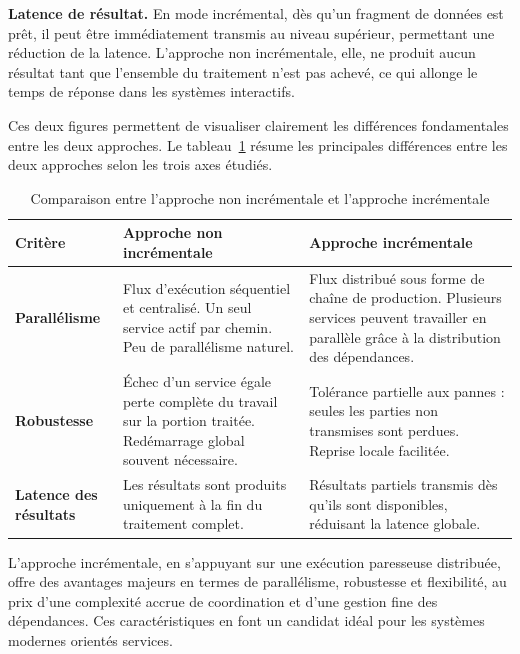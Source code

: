 \textbf{Latence de résultat.}
En mode incrémental, dès qu’un fragment de données est prêt, il peut être immédiatement transmis au niveau supérieur, permettant une réduction de la latence. L’approche non incrémentale, elle, ne produit aucun résultat tant que l’ensemble du traitement n’est pas achevé, ce qui allonge le temps de réponse dans les systèmes interactifs.

Ces deux figures permettent de visualiser clairement les différences fondamentales entre les deux approches. 
Le tableau~\ref{tab:comparaison-approches} résume les principales différences entre les deux approches selon les trois axes étudiés.
\begin{table}[H]
\centering
\caption{Comparaison entre l’approche non incrémentale et l’approche incrémentale}
\label{tab:comparaison-approches}
\begin{tabular}{|p{3cm}|p{5.2cm}|p{5.2cm}|}
\hline
\textbf{Critère} & \textbf{Approche non incrémentale} & \textbf{Approche incrémentale} \\ \hline
\textbf{Parallélisme} 
& Flux d’exécution séquentiel et centralisé.  
Un seul service actif par chemin.  
Peu de parallélisme naturel. 
& Flux distribué sous forme de chaîne de production.  
Plusieurs services peuvent travailler en parallèle grâce à la distribution des dépendances. \\ \hline

\textbf{Robustesse}
& Échec d’un service égale perte complète du travail sur la portion traitée.  
Redémarrage global souvent nécessaire.
& Tolérance partielle aux pannes : seules les parties non transmises sont perdues.  
Reprise locale facilitée. \\ \hline

\textbf{Latence des résultats}
& Les résultats sont produits uniquement à la fin du traitement complet. 
& Résultats partiels transmis dès qu’ils sont disponibles, réduisant la latence globale. \\ \hline

\end{tabular}
\end{table}


L’approche incrémentale, en s’appuyant sur une exécution paresseuse distribuée, offre des avantages majeurs en termes de parallélisme, robustesse et flexibilité, au prix d’une complexité accrue de coordination et d’une gestion fine des dépendances. Ces caractéristiques en font un candidat idéal pour les systèmes modernes orientés services.

